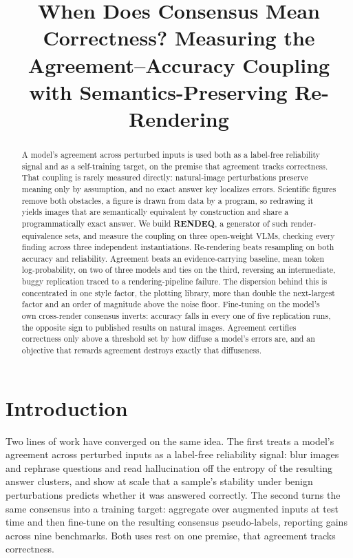 \documentclass[11pt]{article}
\title{When Does Consensus Mean Correctness? Measuring the Agreement--Accuracy Coupling with Semantics-Preserving Re-Rendering}
\begin{document}
\maketitle

\begin{abstract}
A model's agreement across perturbed inputs is used both as a label-free reliability signal and as a self-training target, on the premise that agreement tracks correctness. That coupling is rarely measured directly: natural-image perturbations preserve meaning only by assumption, and no exact answer key localizes errors. Scientific figures remove both obstacles, a figure is drawn from data by a program, so redrawing it yields images that are semantically equivalent by construction and share a programmatically exact answer. We build \textbf{RENDEQ}, a generator of such render-equivalence sets, and measure the coupling on three open-weight VLMs, checking every finding across three independent instantiations. Re-rendering beats resampling on both accuracy and reliability. Agreement beats an evidence-carrying baseline, mean token log-probability, on two of three models and ties on the third, reversing an intermediate, buggy replication traced to a rendering-pipeline failure. The dispersion behind this is concentrated in one style factor, the plotting library, more than double the next-largest factor and an order of magnitude above the noise floor. Fine-tuning on the model's own cross-render consensus inverts: accuracy falls in every one of five replication runs, the opposite sign to published results on natural images. Agreement certifies correctness only above a threshold set by how diffuse a model's errors are, and an objective that rewards agreement destroys exactly that diffuseness.
\end{abstract}

\printkeywords

\section{Introduction}
\label{sec:intro}

Two lines of work have converged on the same idea. The first treats a model's agreement across perturbed inputs as a label-free reliability signal: \citet{zhang2024vluncertainty} blur images and rephrase questions and read hallucination off the entropy of the resulting answer clusters, and \citet{rosenfeld2025stability} show at scale that a sample's stability under benign perturbations predicts whether it was answered correctly. The second turns the same consensus into a training target: \citet{kaya2026efficient} aggregate over augmented inputs at test time and then fine-tune on the resulting consensus pseudo-labels, reporting gains across nine benchmarks. Both uses rest on one premise, that agreement tracks correctness.
\end{document}
